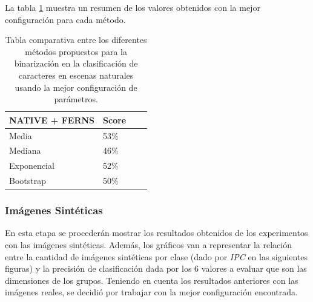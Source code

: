 	La tabla \ref{table: reales-comparativa} muestra un resumen de los valores obtenidos con la mejor configuración para cada método.
	
	\begin{table}
		\centering
		\begin{tabular}{ | l | l | l | p{5cm} |}
    			\hline
    				\textbf{NATIVE + FERNS} & \textbf{Score} \\ \hline
    				Media & 53\% \\ \hline
    				Mediana & 46\%\\ \hline
    				Exponencial & 52\% \\ \hline
    				Bootstrap & 50\%\\ 
    			\hline
    		\end{tabular}
    		\caption[Resultados imagenes naturales]{Tabla comparativa entre los diferentes métodos propuestos para la binarización en la clasificación de caracteres en escenas naturales usando la mejor configuración de parámetros.}
    		\label{table: reales-comparativa}
    	\end{table}
    	
    	
    	\newpage
    	\subsubsection{Imágenes Sintéticas}
    	
    En esta etapa se procederán mostrar los resultados obtenidos de los experimentos con las imágenes sintéticas. Además, los gráficos van a representar la relación entre la cantidad de imágenes sintéticas por clase (dado por \textit{IPC} en las siguientes figuras) y la precisión de clasificación dada por los $6$ valores a evaluar que son las dimensiones de los grupos. Teniendo en cuenta los resultados anteriores con las imágenes reales, se decidió por trabajar con la mejor configuración encontrada.
  
